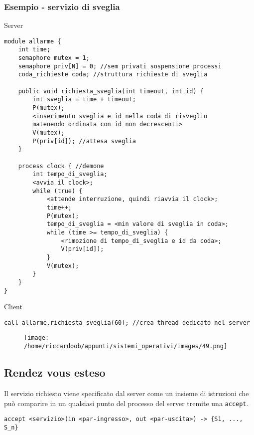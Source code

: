 \subsubsection{Esempio - servizio di sveglia}
Server
\begin{verbatim}
module allarme {
    int time;
    semaphore mutex = 1;
    semaphore priv[N] = 0; //sem privati sospensione processi
    coda_richieste coda; //struttura richieste di sveglia
    
    public void richiesta_sveglia(int timeout, int id) {
        int sveglia = time + timeout;
        P(mutex);
        <inserimento sveglia e id nella coda di risveglio
        matenendo ordinata con id non decrescenti>
        V(mutex);
        P(priv[id]); //attesa sveglia
    }
    
    process clock { //demone
        int tempo_di_sveglia;
        <avvia il clock>;
        while (true) {
            <attende interruzione, quindi riavvia il clock>;
            time++;
            P(mutex);
            tempo_di_sveglia = <min valore di sveglia in coda>;
            while (time >= tempo_di_sveglia) {
                <rimozione di tempo_di_sveglia e id da coda>;
                V(priv[id]);
            }
            V(mutex);
        }
    }
}
\end{verbatim}
Client
\begin{verbatim}
call allarme.richiesta_sveglia(60); //crea thread dedicato nel server
\end{verbatim}

\begin{figure}[H]
    \centering
    \texttt{[image: /home/riccardoob/appunti/sistemi\_operativi/images/49.png]}
\end{figure}

\subsection{Rendez vous esteso}
Il servizio richiesto viene specificato dal server come un insieme di istruzioni che può comparire in un qualsiasi punto del processo del server tremite una \texttt{accept}.

\begin{verbatim}
accept <servizio>(in <par-ingresso>, out <par-uscita>) -> {S1, ..., S_n}
\end{verbatim}

